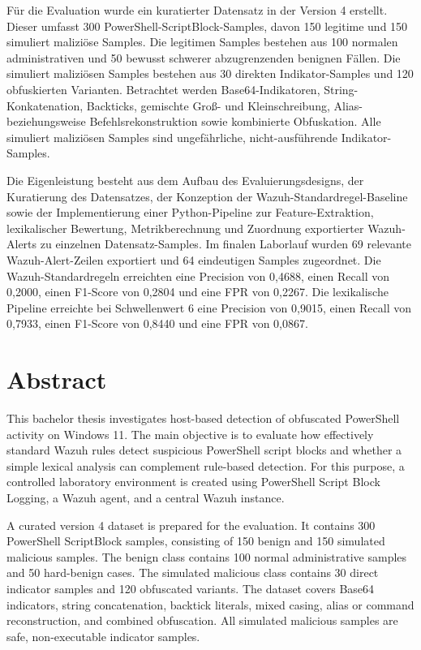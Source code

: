 \documentclass[12pt,a4paper,oneside,parskip=half]{scrreprt}
\begin{document}
Für die Evaluation wurde ein kuratierter Datensatz in der Version 4 erstellt. Dieser umfasst 300 PowerShell-ScriptBlock-Samples, davon 150 legitime und 150 simuliert maliziöse Samples. Die legitimen Samples bestehen aus 100 normalen administrativen und 50 bewusst schwerer abzugrenzenden benignen Fällen. Die simuliert maliziösen Samples bestehen aus 30 direkten Indikator-Samples und 120 obfuskierten Varianten. Betrachtet werden Base64-Indikatoren, String-Konkatenation, Backticks, gemischte Groß- und Kleinschreibung, Alias- beziehungsweise Befehlsrekonstruktion sowie kombinierte Obfuskation. Alle simuliert maliziösen Samples sind ungefährliche, nicht-ausführende Indikator-Samples.

Die Eigenleistung besteht aus dem Aufbau des Evaluierungsdesigns, der Kuratierung des Datensatzes, der Konzeption der Wazuh-Standardregel-Baseline sowie der Implementierung einer Python-Pipeline zur Feature-Extraktion, lexikalischer Bewertung, Metrikberechnung und Zuordnung exportierter Wazuh-Alerts zu einzelnen Datensatz-Samples. Im finalen Laborlauf wurden 69 relevante Wazuh-Alert-Zeilen exportiert und 64 eindeutigen Samples zugeordnet. Die Wazuh-Standardregeln erreichten eine Precision von 0{,}4688, einen Recall von 0{,}2000, einen F1-Score von 0{,}2804 und eine FPR von 0{,}2267. Die lexikalische Pipeline erreichte bei Schwellenwert 6 eine Precision von 0{,}9015, einen Recall von 0{,}7933, einen F1-Score von 0{,}8440 und eine FPR von 0{,}0867.
\clearpage

\chapter*{Abstract}
This bachelor thesis investigates host-based detection of obfuscated PowerShell activity on Windows 11. The main objective is to evaluate how effectively standard Wazuh rules detect suspicious PowerShell script blocks and whether a simple lexical analysis can complement rule-based detection. For this purpose, a controlled laboratory environment is created using PowerShell Script Block Logging, a Wazuh agent, and a central Wazuh instance.

A curated version 4 dataset is prepared for the evaluation. It contains 300 PowerShell ScriptBlock samples, consisting of 150 benign and 150 simulated malicious samples. The benign class contains 100 normal administrative samples and 50 hard-benign cases. The simulated malicious class contains 30 direct indicator samples and 120 obfuscated variants. The dataset covers Base64 indicators, string concatenation, backtick literals, mixed casing, alias or command reconstruction, and combined obfuscation. All simulated malicious samples are safe, non-executable indicator samples.
\end{document}
